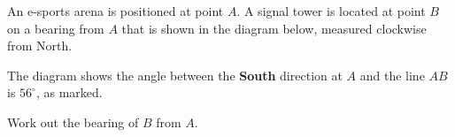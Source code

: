 \begin{question}
\noindent An e-sports arena is positioned at point $A$. A signal tower is located at point $B$ on a bearing from $A$ that is shown in the diagram below, measured clockwise from North.

\begin{center}
\end{center}

\noindent The diagram shows the angle between the \textbf{South} direction at $A$ and the line $AB$ is $56^\circ$, as marked.

\noindent Work out the bearing of $B$ from $A$.

\vspace{4cm}

\begin{flushright}
\end{flushright}
\end{question}
